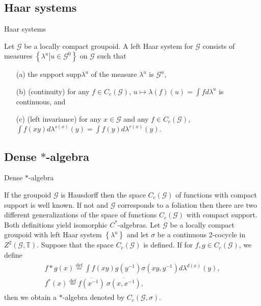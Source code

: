 \documentclass{beamer}
\theoremstyle{plain}
\newcommand{\G}{\mathcal{G}}
\newcommand{\supp}{\mathrm{supp}}
\newcommand{\T}{\mathbb{T}}
\newcommand{\la}{\lambda}
\newcommand{\bean}{\begin{eqnarray*}}
\newcommand{\eean}{\end{eqnarray*}}
\newcommand{\bydef}{\stackrel{\mathrm{def}}{=}}
\begin{document}
\subsection{Haar systems}
\begin{frame}
		\begin{center}
		\huge Haar systems \normalsize\\
	\end{center}

\begin{definition}
Let $\G$ be a locally compact  groupoid. A \alert{left  Haar system} for $\G$
consists of measures $\left\{\left.\la^u \right| u \in \G^0\right\}$ on $\G$ such that
\begin{enumerate}
	\item [(a)] the support $\supp\la^u$ of the measure $\la^u$ is $\G^u$,
	\item [(b)]  (continuity) for any $f \in C_c\left(\G\right)$, $u \mapsto \la(f)(u) = \int f d\la^u$ is continuous, and
	\item [(c)]  (left invariance) for any $x\in \G$ and any $f \in  C_c(\G )$, $\int  f ( x y ) d\la^{s(x)}(y) =
	\int f(y)d\la^{r(x)}(y)$.
	
\end{enumerate}
\end{definition}
\end{frame}
\subsection{Dense $*$-algebra}

\begin{frame}
		\begin{center}
\huge	Dense $*$-algebra 	\end{center}
	
	
	If the groupoid $\G$ is Hausdorff then the space $C_c\left( \G\right)$ of functions with compact support is well known. If not and $\G$ corresponds to a foliation then  there are two  different generalizations of  the space of functions  $C_c\left( \G\right)$  with compact support. Both definitions yield isomorphic $C^*$-algebras.
	Let $\G$ be a locally compact groupoid with left  Haar system $\left\{\la^u\right\}$ and let $\sigma$ be a continuous 2-cocycle in $Z^2\left(\G, \T\right)$. Suppose that the space $C_c\left( \G\right)$ is defined.
	If for $f ,g \in C_c(\G)$, we define
	\bean
	\begin{split}
		f * g \left(x\right)\bydef 
		\int f ( x y ) g \left( y^{-1}\right)\sigma\left(xy, y^{-1} \right) d\la^{d(x)}(y),\\
		f^* ( x ) \bydef \overline{f ( x^{ -1})}~\overline{\sigma\left(x, x^{-1} \right)}, 	
	\end{split}
	\eean
	then we obtain a $*$-algebra denoted by $C_c(\G, \sigma)$.
	
	
\end{frame}
\end{document}
